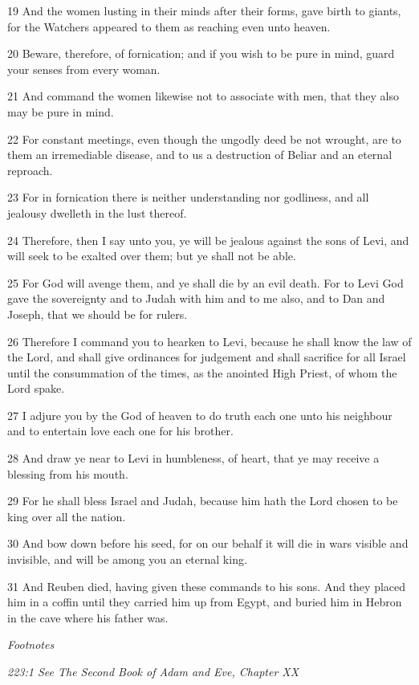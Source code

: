 \par 19 And the women lusting in their minds after their forms, gave birth to giants, for the Watchers appeared to them as reaching even unto heaven.

\par 20 Beware, therefore, of fornication; and if you wish to be pure in mind, guard your senses from every woman.

\par 21 And command the women likewise not to associate with men, that they also may be pure in mind.

\par 22 For constant meetings, even though the ungodly deed be not wrought, are to them an irremediable disease, and to us a destruction of Beliar and an eternal reproach.

\par 23 For in fornication there is neither understanding nor godliness, and all jealousy dwelleth in the lust thereof.

\par 24 Therefore, then I say unto you, ye will be jealous against the sons of Levi, and will seek to be exalted over them; but ye shall not be able.

\par 25 For God will avenge them, and ye shall die by an evil death. For to Levi God gave the sovereignty and to Judah with him and to me also, and to Dan and Joseph, that we should be for rulers.

\par 26 Therefore I command you to hearken to Levi, because he shall know the law of the Lord, and shall give ordinances for judgement and shall sacrifice for all Israel until the consummation of the times, as the anointed High Priest, of whom the Lord spake.

\par 27 I adjure you by the God of heaven to do truth each one unto his neighbour and to entertain love each one for his brother.

\par 28 And draw ye near to Levi in humbleness, of heart, that ye may receive a blessing from his mouth.

\par 29 For he shall bless Israel and Judah, because him hath the Lord chosen to be king over all the nation.

\par 30 And bow down before his seed, for on our behalf it will die in wars visible and invisible, and will be among you an eternal king.

\par 31 And Reuben died, having given these commands to his sons. And they placed him in a coffin until they carried him up from Egypt, and buried him in Hebron in the cave where his father was.

\par \textit{Footnotes}

\par \textit{223:1 See The Second Book of Adam and Eve, Chapter XX}


